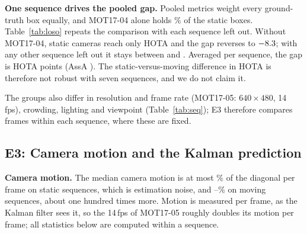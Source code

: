 \documentclass[conference]{IEEEtran}
\begin{document}
\textbf{One sequence drives the pooled gap.} Pooled metrics weight every ground-truth box equally, and MOT17-04 alone
holds \vFourShareStaticGT\% of the static boxes. Table~\ref{tab:loso} repeats the comparison with each sequence left out.
Without MOT17-04, static cameras reach only \vLosoNoFourStatic{} HOTA and the gap reverses to $-8.3$; with any
other sequence left out it stays between \vLosoRestGapMin{} and \vLosoRestGapMax. Averaged per sequence, the gap is
\vSeqMeanGap{} HOTA points (AssA \vSeqMeanAssAGap). The static-versus-moving difference in HOTA is therefore not robust
with seven sequences, and we do not claim it.

The groups also differ in resolution and frame rate (MOT17-05: $640\times480$, 14\,fps), crowding, lighting and
viewpoint (Table~\ref{tab:seq}); E3 therefore compares frames within each sequence, where these are fixed.

\begin{table}[t]
\centering
\caption{Leave-one-sequence-out check (official settings). HOTA pooled over the remaining sequences of each group;
re-found: lost tracks matched again after 9--16 lost frames (E3).}
\label{tab:loso}
\footnotesize
\setlength{\tabcolsep}{4pt}

\end{table}

\begin{table}[t]
\centering
\caption{Per-sequence properties and results (official settings). Res.: image height. Motion: median camera motion
per frame (E3). Pred.\ IoU: mean IoU between a one-frame Kalman prediction and its matched detection. $\rho$: Spearman
correlation over the frames of the sequence. Re-found: lost tracks matched again after 9--16 lost frames.}
\label{tab:seq}
\footnotesize
\setlength{\tabcolsep}{4pt}

\end{table}

\subsection{E3: Camera motion and the Kalman prediction}\label{sec:e3}
\textbf{Camera motion.} The median camera motion is at most \vMotionStaticMax\% of the diagonal per frame on static
sequences, which is estimation noise, and \vMotionMovingMin--\vMotionMovingMax\% on moving sequences, about one hundred
times more. Motion is measured per frame, as the Kalman filter sees it, so the 14\,fps of MOT17-05 roughly doubles
its motion per frame; all statistics below are computed within a sequence.
\end{document}

